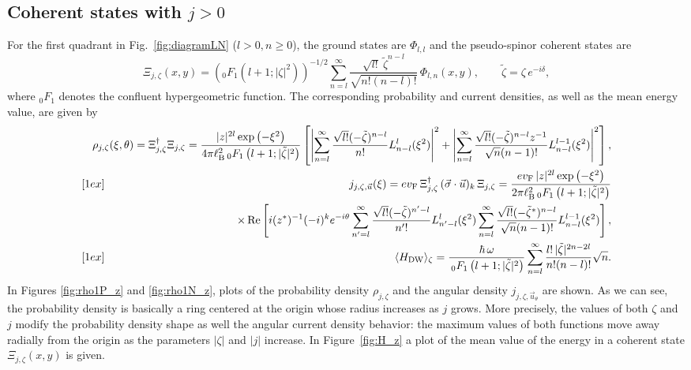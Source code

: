 \documentclass[aps,showpacs,showkeys]{revtex4}
\begin{document}
\subsection{Coherent states with $j>0$}\label{sec4.1}

For the first quadrant in Fig.~\ref{fig:diagramLN} ($l>0, n\geq 0$), the ground states are $\Phi_{l,l}$ and the pseudo-spinor coherent states are
\begin{equation}\label{97}
\Xi_{j,\zeta}(x,y) =\left({}_0F_1\left(l+1;\vert {\zeta}\vert^2\right)\right)^{-1/2} \sum_{n=l}^{\infty}\frac{\sqrt{l!}\ \tilde{\zeta}^{n-l}}{\sqrt{n!(n-l)!}}\, \Phi_{l,n} (x,y), \qquad \tilde{\zeta}=\zeta\, e^{-i\delta},
\end{equation}
where ${}_0F_1$ denotes the confluent hypergeometric function. The corresponding probability and current densities, as well as the mean energy value, are given by
\begin{eqnarray}
\hskip-0.8cm 	&&
\rho_{j,\zeta}(\xi,\theta)=\Xi^{\dagger}_{j,\zeta} \Xi_{j,\zeta}= \frac{\vert z\vert^{2l}\exp\left(-\xi^2\right)}{4\pi\ell_{\rm B}^{2}\, _0F_1\left(l+1;\vert\tilde{\zeta}\vert^2\right)}
 \left[ \left\vert\sum_{n=l}^{\infty}\frac{\sqrt{l!}(-\tilde{\zeta})^{n-l}}{n!}L_{n-l}^{l}(\xi^2)\right\vert^2 +\left\vert\sum_{n=l}^{\infty}\frac{\sqrt{l!}(-\tilde{\zeta})^{n-l}z^{-1}}{\sqrt{n}(n-1)!}L_{n-l}^{l-1}(\xi^2)\right\vert^2\right],  
 \label{98a} 
  \\ [1ex]
\hskip-0.8cm 	&&
j_{j,\zeta,\vec{u}}(\xi)=ev_{\rm F}\, \Xi^{\dagger}_{j,\zeta}\,(\vec{\sigma}\cdot\vec{u})_k\,
\Xi_{j,\zeta}=\frac{ev_{\rm F}\,\vert z\vert^{2l}\exp\left(-\xi^2\right)}{2\pi\ell_{\rm B}^{2} \, _0F_1\left(l+1;\vert\tilde{\zeta}\vert^2\right)} \nonumber \\
\hskip-0.8cm 	&\, & \hskip4.5cm \times\, \textrm{Re}\left[ i(z^\ast)^{-1}(-i)^{k}e^{-i\theta}
\sum_{n'=l}^{\infty}\frac{\sqrt{l!}(-\tilde{\zeta})^{n'-l}}{n'!}L_{n'-l}^{l}(\xi^2)
\sum_{n=l}^{\infty}\frac{\sqrt{l!}(-\tilde{\zeta}^\ast)^{n-l}}{\sqrt{n}(n-1)!}L_{n-l}^{l-1}(\xi^2)
\right],\label{98b}
  \\ [1ex]
\hskip-0.8cm 	&&
\langle H_{\rm DW}\rangle_\zeta=\frac{\hbar\,\omega}{\, _0F_1\left(l+1;\vert\tilde{\zeta}\vert^2\right)}\sum_{n=l}^{\infty}\frac{l!\,\vert\tilde{\zeta}\vert^{2n-2l}}{n!(n-l)!}\sqrt{n}. \label{98c}
\end{eqnarray}
In Figures \ref{fig:rho1P_z} and  \ref{fig:rho1N_z}, plots of the probability density $\rho_{j,\zeta}$ and the angular density 
$j_{j,\zeta,\vec{u}_\theta}$ are shown. As we can see, the probability density is basically a ring centered at the origin whose radius increases as $j$ grows. More precisely, the values of both $\zeta$ and $j$ modify the probability density shape as well the angular current density behavior: the maximum values of both functions move away radially from the origin as the parameters $\vert\zeta\vert$ and $\vert j\vert$ increase.
In Figure~\ref{fig:H_z} a plot of the mean value of the energy in a coherent state $\Xi_{{j,\zeta}}(x,y)$ is given.
\end{document}
